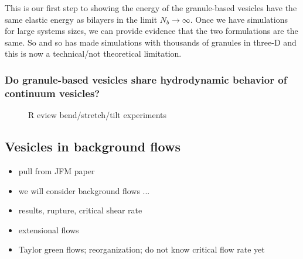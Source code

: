 This is our first step to showing the energy of the granule-based
vesicles have the same elastic energy as bilayers in the limit $N_b \to \infty$.
Once we have simulations for large systems sizes, we can provide
evidence that the two formulations are the same.
So and so has made simulations with thousands of granules in three-D
and this is now a technical/not theoretical limitation. 

\subsubsection{Do granule-based vesicles share hydrodynamic behavior of continuum vesicles?}

\begin{figure}R
  eview bend/stretch/tilt experiments
\end{figure}
\subsection{Vesicles in background flows}
\begin{itemize}
\item pull from JFM paper
\item we will consider background flows ...
\item results, rupture, critical shear rate
\item extensional flows
\item Taylor green flows; reorganization; do not know critical flow rate yet
\end{itemize}

